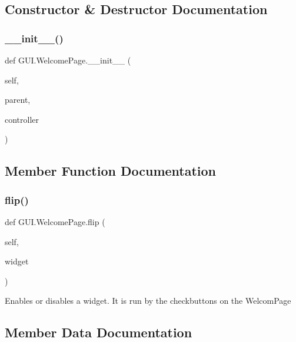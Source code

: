 \subsection{Constructor \& Destructor Documentation}
\mbox{\label{class_g_u_i_1_1_welcome_page_aa88665446973a13fe29a978a1a9962e3}} 
\subsubsection{\texorpdfstring{\_\_init\_\_()}{\_\_init\_\_()}}
{\footnotesize\ttfamily def G\+U\+I.\+Welcome\+Page.\+\_\+\+\_\+init\+\_\+\+\_\+ (\begin{DoxyParamCaption}\item[{}]{self,  }\item[{}]{parent,  }\item[{}]{controller }\end{DoxyParamCaption})}



\subsection{Member Function Documentation}
\mbox{\label{class_g_u_i_1_1_welcome_page_a7612699922f2f3789aa58e098797b949}} 
\subsubsection{\texorpdfstring{flip()}{flip()}}
{\footnotesize\ttfamily def G\+U\+I.\+Welcome\+Page.\+flip (\begin{DoxyParamCaption}\item[{}]{self,  }\item[{}]{widget }\end{DoxyParamCaption})}

\begin{DoxyVerb}Enables or disables a widget. It is run by the checkbuttons on the WelcomPage
\end{DoxyVerb}
 

\subsection{Member Data Documentation}
\mbox{\label{class_g_u_i_1_1_welcome_page_a67a73c2b555ee6e4ab9eea5a3048e866}} 
